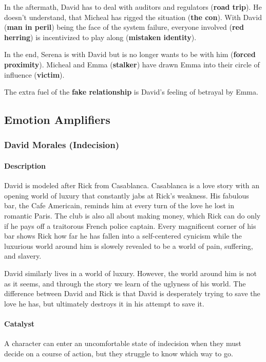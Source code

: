 In the aftermath, David has to deal with auditors and regulators (\textbf{road trip}).
He doesn't understand, that Micheal has rigged the situation (\textbf{the con}).
With David (\textbf{man in peril}) being the face of the system failure, everyone
involved (\textbf{red herring}) is incentivized to play along (\textbf{mistaken identity}).

In the end, Serena is with David but is no longer wants to be with him (\textbf{forced 
proximity}).
Micheal and Emma (\textbf{stalker}) have drawn Emma into their circle of influence 
(\textbf{victim}).

The extra fuel of the \textbf{fake relationship} is David's feeling of betrayal by Emma.




\subsection{Emotion Amplifiers}

\subsubsection{David Morales (Indecision)}

\paragraph{Description} David is modeled after Rick from Casablanca. Casablanca is a love story
with an opening world of luxury that constantly jabs at Rick's weakness. His fabulous bar, 
the Cafe Americain, reminds him at every turn of the love he lost in romantic Paris. The club
is also all about making money, which Rick can do only if he pays off a traitorous French 
police captain. Every magnificent corner of his bar shows Rick how far he has fallen into 
a self-centered cynicism while the luxurious world around him is slowely revealed to be 
a world of pain, suffering, and slavery.

David similarly lives in a world of luxury. However, the world around him is not as it seems,
and through the story we learn of the uglyness of his world. The difference between David
and Rick is that David is desperately trying to save the love he has, but ultimately destroys 
it in his attempt to save it. 

\paragraph{Catalyst} A character can enter an uncomfortable state of indecision when they
must decide on a course of action, but they struggle to know which way to go.


